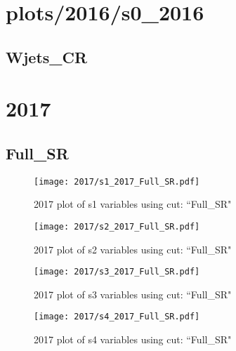 \documentclass{article}
\begin{document}
    \section*{plots/2016/s0_2016}
      \subsection*{Wjets\_CR}
    \section*{2017}
      \subsection*{Full\_SR}
                        \begin{figure}[H]
                            \centering
                            \caption{2017 plot of s1 variables using cut: ``Full\_SR"}
                            \texttt{[image: 2017/s1\_2017\_Full\_SR.pdf]}
                        \end{figure}    
                        \begin{figure}[H]
                            \centering
                            \caption{2017 plot of s2 variables using cut: ``Full\_SR"}
                            \texttt{[image: 2017/s2\_2017\_Full\_SR.pdf]}
                        \end{figure}    
                        \begin{figure}[H]
                            \centering
                            \caption{2017 plot of s3 variables using cut: ``Full\_SR"}
                            \texttt{[image: 2017/s3\_2017\_Full\_SR.pdf]}
                        \end{figure}    
                        \begin{figure}[H]
                            \centering
                            \caption{2017 plot of s4 variables using cut: ``Full\_SR"}
                            \texttt{[image: 2017/s4\_2017\_Full\_SR.pdf]}
                        \end{figure}    
\end{document}
